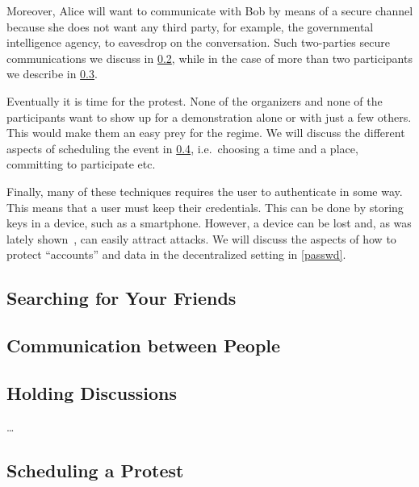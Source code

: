 Moreover, Alice will want to communicate with Bob by means of a secure channel because 
she does not want any third party, for example, the governmental intelligence agency, 
to eavesdrop on the conversation. Such two-parties secure communications we discuss 
in \cref{Communicating}, while in the case of more than two participants we describe 
in \cref{Discussions}.

Eventually it is time for the protest.
None of the organizers and none of the participants want to show up for 
a demonstration alone or with just a few others.
This would make them an easy prey for the regime.
We will discuss the different aspects of scheduling the event in 
\cref{Scheduling}, i.e.\ choosing a time and a place, committing to participate 
etc.

Finally, many of these techniques requires the user to authenticate in some 
way.
This means that a user must keep their credentials.
This can be done by storing keys in a device, such as a smartphone.
However, a device can be lost and, as was lately shown~\cite{AppleVsFBI}, can 
easily attract attacks.
We will discuss the aspects of how to protect \enquote{accounts} and data in 
the decentralized setting in \cref{passwd}.

\subsection{Searching for Your Friends}
\label{UserSearch}





\subsection{Communication between People}
\label{Communicating}



\subsection{Holding Discussions}
\label{Discussions}

\citet{multiotr2009} \dots



\subsection{Scheduling a Protest}
\label{Scheduling}

